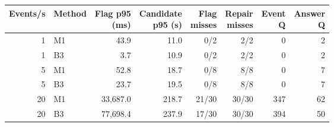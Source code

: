 \begin{tabular}{rlrrrrrr}
\toprule
Events/s & Method & \shortstack{Flag p95\\(ms)} & \shortstack{Candidate\\p95 (s)} & \shortstack{Flag\\misses} & \shortstack{Repair\\misses} & \shortstack{Event\\Q} & \shortstack{Answer\\Q} \\
\midrule
1 & M1 & 43.9 & 11.0 & 0/2 & 2/2 & 0 & 2 \\
1 & B3 & 3.7 & 10.9 & 0/2 & 2/2 & 0 & 2 \\
5 & M1 & 52.8 & 18.7 & 0/8 & 8/8 & 0 & 7 \\
5 & B3 & 23.7 & 19.5 & 0/8 & 8/8 & 0 & 7 \\
20 & M1 & 33,687.0 & 218.7 & 21/30 & 30/30 & 347 & 62 \\
20 & B3 & 77,698.4 & 237.9 & 17/30 & 30/30 & 394 & 50 \\
\bottomrule
\end{tabular}
